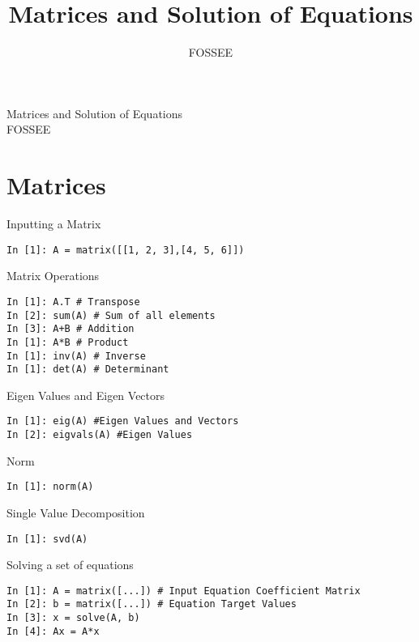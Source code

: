 \documentclass[12pt]{article}
\title{Matrices and Solution of Equations}
\author{FOSSEE}
\begin{document}
\date{}
\vspace{-1in}
\begin{center}
\LARGE{Matrices and Solution of Equations}\\
\large{FOSSEE}
\end{center}
\section{Matrices}
Inputting a Matrix
\begin{verbatim}
In [1]: A = matrix([[1, 2, 3],[4, 5, 6]])
\end{verbatim}
Matrix Operations
\begin{verbatim}
In [1]: A.T # Transpose
In [2]: sum(A) # Sum of all elements
In [3]: A+B # Addition
In [1]: A*B # Product
In [1]: inv(A) # Inverse
In [1]: det(A) # Determinant
\end{verbatim}

Eigen Values and Eigen Vectors
\begin{verbatim}
In [1]: eig(A) #Eigen Values and Vectors
In [2]: eigvals(A) #Eigen Values 
\end{verbatim}
Norm
\begin{verbatim}
In [1]: norm(A)
\end{verbatim}
Single Value Decomposition
\begin{verbatim}
In [1]: svd(A)
\end{verbatim}
Solving a set of equations
\begin{verbatim}
In [1]: A = matrix([...]) # Input Equation Coefficient Matrix   
In [2]: b = matrix([...]) # Equation Target Values
In [3]: x = solve(A, b)
In [4]: Ax = A*x
\end{verbatim}
\end{document}
